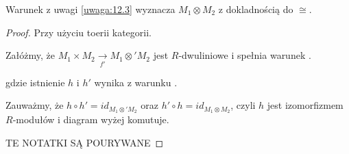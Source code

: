 \begin{remark} Warunek \hyperref[warunek:z:12.3]{{\color{purple}\PHcat}} z uwagi \ref{uwaga:12.3} wyznacza $M_1\otimes M_2$ z dokladnością do $\cong$.
\end{remark}

\begin{proof} Przy użyciu toerii kategorii.

  Załóżmy, że $M_1\times M_2\xrightarrow[f']{} M_1\otimes' M_2$ jest $R$-dwuliniowe i spełnia warunek \hyperref[warunek:z:12.3]{{\color{purple}\PHcat}}. 

  \begin{center}\end{center}
  gdzie istnienie $h$ i $h'$ wynika z warunku \hyperref[warunek:z:12.3]{{\color{purple}\PHcat}}.

  Zauważmy, że $h\circ h'=id_{M_1\otimes' M_2}$ oraz $h'\circ h=id_{M_1\otimes M_2}$, czyli $h$ jest izomorfizmem $R$-modułów i diagram wyżej komutuje.

  {\large\color{orange}TE NOTATKI SĄ POURYWANE}
\end{proof}
